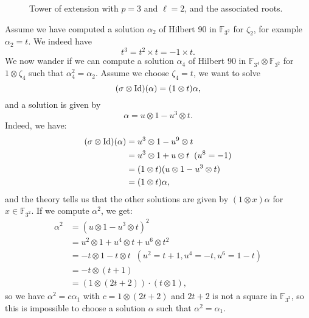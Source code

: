 \documentclass[a4paper,11pt]{article}
\begin{document}
\begin{figure}
  \centering
{}
\phantom{and}
  \caption{Tower of extension with $p=3$ and $\ell=2$, and the associated roots.}
  \label{fig:p3l2}
\end{figure}



Assume we have computed a solution $\alpha_2$ of Hilbert 90 in $\mathbb{F}_{3^2}$ for
$\zeta_2$, for example $\alpha_2=t$. We indeed have
\[
  t^3 = t^2\times t=-1\times t.
\]
We now wander if we can compute a solution $\alpha_4$ of Hilbert 90 in
$\mathbb{F}_{3^4}\otimes\mathbb{F}_{3^2}$ for $1\otimes\zeta_4$ such
that $\alpha_4^2=\alpha_2$. Assume we choose $\zeta_4=t$, we want to solve
\[
  (\sigma\otimes\operatorname{Id})(\alpha) = (1\otimes t)\alpha,
\]
and a solution is given by 
\[
  \alpha = u\otimes1-u^3\otimes t.
\]
Indeed, we have:
\begin{align*}
  (\sigma\otimes\operatorname{Id})(\alpha) &= u^3\otimes1-u^9\otimes t \\
  &= u^3\otimes 1+u\otimes t \;\;(u^8 = -1)\\
  &= (1\otimes t)(u\otimes1-u^3\otimes t) \\
  &= (1\otimes t)\alpha,
\end{align*}
and the theory tells us that the other solutions are given by $(1\otimes
x)\alpha$ for $x\in\mathbb{F}_{3^2}$. If we compute $\alpha^2$, we get:
\begin{align*}
\alpha^2 &= (u\otimes1-u^3\otimes t)^2 \\
&= u^2\otimes 1 + u^4\otimes t + u^6\otimes t^2 \\
&= -t\otimes 1 - t\otimes t\;\;(u^2=t+1, u^4=-t, u^6=1-t)\\
&= -t\otimes (t+1) \\
&= (1\otimes (2t+2))\cdot(t\otimes 1),
\end{align*}
so we have $\alpha^2=c\alpha_1$ with $c=1\otimes (2t+2)$ and $2t+2$ is not a
square in $\mathbb{F}_{3^2}$, so this is impossible to choose a solution
$\alpha$ such that $\alpha^2=\alpha_1$.
\end{document}
